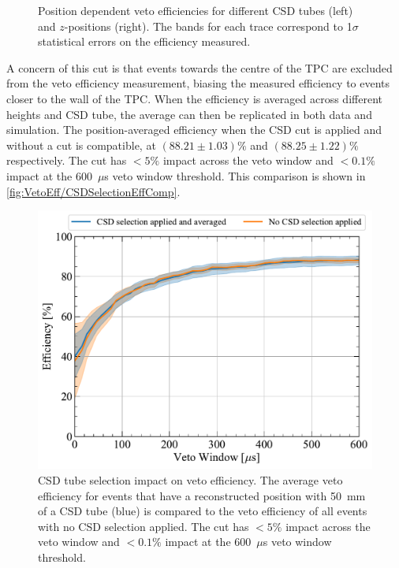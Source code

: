 \begin{enumerate}
\begin{figure}[!h]
\begin{subfigure}[b]{0.49\textwidth}
            \caption{}
    		\label{fig:VetoEff/VetoEffPositionDependenceCSD}
    	\end{subfigure}
    	\caption[Position dependent veto efficiencies for different CSD tubes (left) and $z$-positions (right).]{Position dependent veto efficiencies for different CSD tubes (left) and $z$-positions (right). The bands for each trace correspond to 1$\sigma$ statistical errors on the efficiency measured.}
    	\label{fig:VetoEff/VetoEffPositionDependence}
    \end{figure}
    
	A concern of this cut is that events towards the centre of the TPC are excluded from the veto efficiency measurement, biasing the measured efficiency to events closer to the wall of the TPC. When the efficiency is averaged across different heights and CSD tube, the average can then be replicated in both data and simulation. 
    The position-averaged efficiency when the CSD cut is applied and without a cut is compatible, at  $(88.21\pm1.03)\%$ and $(88.25\pm1.22)\%$ respectively.
	The cut has $<5\%$ impact across the veto window and $<0.1\%$ impact at the 600~$\mu$s veto window threshold. This comparison is shown in \autoref{fig:VetoEff/CSDSelectionEffComp}.
    \begin{figure}[!h]
    	\centering
    	\includegraphics[width=0.7\linewidth]{figures/VetoEfficiency/CSDSelectionCheck.pdf}
    	\caption[CSD tube selection impact on veto efficiency.]{CSD tube selection impact on veto efficiency. The average veto efficiency for events that have a reconstructed position with 50~mm of a CSD tube (blue) is compared to the veto efficiency of all events with no CSD selection applied. The cut has $<5\%$ impact across the veto window and $<0.1\%$ impact at the 600~$\mu$s veto window threshold.}
    	\label{fig:VetoEff/CSDSelectionEffComp}
    \end{figure}


\end{enumerate}
